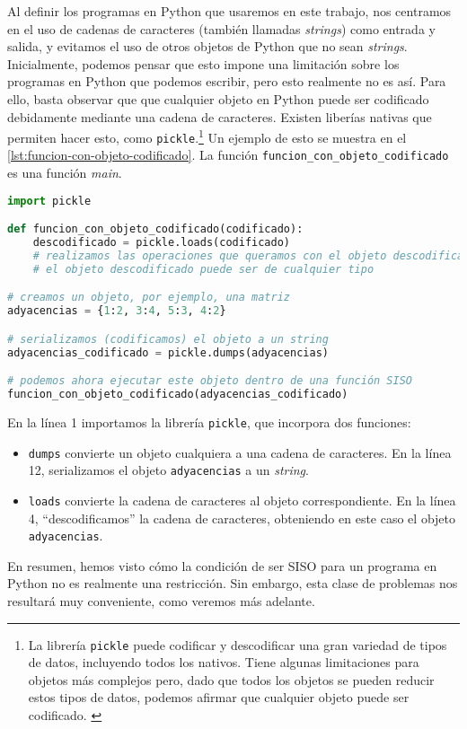 Al definir los programas en Python que usaremos en este trabajo, nos centramos en el uso de cadenas de caracteres (también llamadas \emph{strings}) como entrada y salida, y evitamos el uso de otros objetos de Python que no sean \emph{strings}. Inicialmente, podemos pensar que esto impone una limitación sobre los programas en Python que podemos escribir, pero esto realmente no es así. Para ello, basta observar que que cualquier objeto en Python puede ser codificado debidamente mediante una cadena de caracteres. Existen liberías nativas que permiten hacer esto, como \lstinline{pickle}.\footnote{La librería \lstinline{pickle} puede codificar y descodificar una gran variedad de tipos de datos, incluyendo todos los nativos. Tiene algunas limitaciones para objetos más complejos pero, dado que todos los objetos se pueden reducir estos tipos de datos, podemos afirmar que cualquier objeto puede ser codificado. \cite{Lutz2013}} Un ejemplo de esto se muestra en el \cref{lst:funcion-con-objeto-codificado}. La función \texttt{funcion\_con\_objeto\_codificado} es una función \emph{main}.
\vspace{8pt}
\begin{lstlisting}[language=Python, caption=\lstinline{funcion_con_objeto_codificado.py},label={lst:funcion-con-objeto-codificado}]
import pickle

def funcion_con_objeto_codificado(codificado):
    descodificado = pickle.loads(codificado)
    # realizamos las operaciones que queramos con el objeto descodificado
    # el objeto descodificado puede ser de cualquier tipo

# creamos un objeto, por ejemplo, una matriz
adyacencias = {1:2, 3:4, 5:3, 4:2}

# serializamos (codificamos) el objeto a un string
adyacencias_codificado = pickle.dumps(adyacencias)

# podemos ahora ejecutar este objeto dentro de una función SISO
funcion_con_objeto_codificado(adyacencias_codificado)
\end{lstlisting}

En la línea 1 importamos la librería \texttt{pickle}, que incorpora dos funciones:
\begin{itemize}
    \item \texttt{dumps} convierte un objeto cualquiera a una cadena de caracteres. En la línea 12, serializamos el objeto \texttt{adyacencias} a un \emph{string}.
    \item \texttt{loads} convierte la cadena de caracteres al objeto correspondiente. En la línea 4, ``descodificamos'' la cadena de caracteres, obteniendo en este caso el objeto \texttt{adyacencias}.
\end{itemize}
En resumen, hemos visto cómo la condición de ser SISO para un programa en Python no es realmente una restricción. \label{lab:siso-no-restr} Sin embargo, esta clase de problemas nos resultará muy conveniente, como veremos más adelante.

